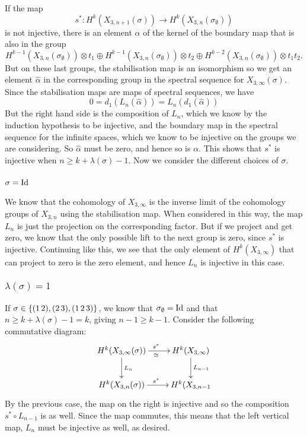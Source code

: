 If the map 
\[ s^* : H^k(X_{3,n+1}(\sigma)) \to
H^k(X_{3,n}(\sigma_{\emptyset})) \]
is not injective, there is an element $\alpha$ of the kernel of the
boundary map that is also in the group 
\[ H^{k-1}(X_{3,n}(\sigma_{\emptyset})) \otimes t_1 \oplus 
H^{k-1}(X_{3,n}(\sigma_{\emptyset})) \otimes t_2 \oplus 
H^{k-2}(X_{3,n}(\sigma_{\emptyset})) \otimes t_1 t_2. \]
But on these last groups, the stabilisation map is an isomorphism so
we get an element $\widehat{\alpha}$ in the corresponding group in the
spectral sequence for $X_{3,\infty}(\sigma)$. Since the stabilisation
maps are maps of spectral sequences, we have
\[ 0 = d_1(L_{n}(\widehat{\alpha})) = L_n(d_1(\widehat{\alpha})) \]
But the right hand side is the composition of $L_n$, which we know by
the induction hypothesis to be injective, and the boundary map in the
spectral sequence for the infinite spaces, which we know to be
injective on the groups we are considering. So $\widehat{\alpha}$ must
be zero, and hence so is $\alpha$. This shows that $s^*$ is injective
when $n \geq k + \lambda(\sigma) - 1$. Now we consider the different
choices of $\sigma$.

\subsubsection{$\sigma = \operatorname{Id}$}

We know that the cohomology of $X_{3,\infty}$ is the inverse
limit of the cohomology groups of $X_{3,n}$ using the stabilisation
map. 
When considered in this way, the map $L_n$ is just the projection on
the corresponding factor. But if we project and get zero, we know that
the only possible lift to the next group is zero, since $s^*$ is
injective. Continuing like this, we see that the only element of
$H^k(X_{3,\infty})$ that can project to zero is the zero element, and
hence $L_n$ is injective in this case.

\subsubsection{$\lambda(\sigma) = 1$}

If $\sigma \in \left\{ (1\,2),(2\,3),(1\,2\,3) \right\}$, we know that
$\sigma_{\emptyset} = \operatorname{Id}$ and that $n \geq k + \lambda(\sigma) - 1 =
k$, giving $n-1\geq k-1$. Consider the following commutative diagram:
\[ \xymatrix{ H^k(X_{3,\infty}(\sigma)) \ar[r]^{s^*}_{\cong} \ar[d]^{L_n} &
  H^k(X_{3,\infty}) \ar[d]^{L_{n-1}} \\
  H^k(X_{3,n}(\sigma)) \ar[r]^{s^*} & H^k(X_{3,n-1}
} \]
By the previous case, the map on the right is injective and so the
composition $s^* \circ L_{n-1}$ is as well. Since the map commutes,
this means that the left vertical map, $L_n$ must be injective as
well, as desired.

